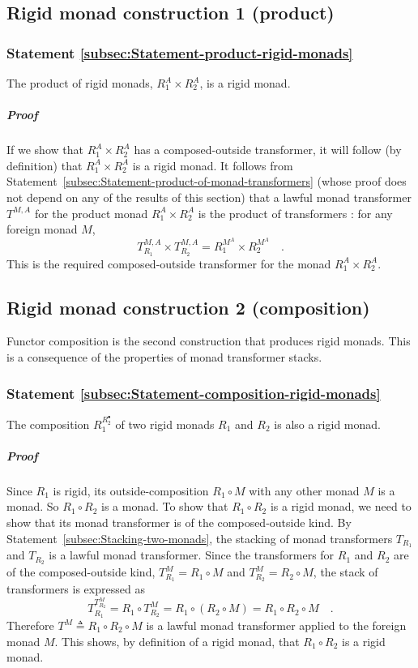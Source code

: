 \subsection{Rigid monad construction 1 (product)}

\subsubsection{Statement \label{subsec:Statement-product-rigid-monads}\ref{subsec:Statement-product-rigid-monads}}

The product of rigid monads, $R_{1}^{A}\times R_{2}^{A}$, is a rigid
monad.

\subparagraph{Proof}

If we show that $R_{1}^{A}\times R_{2}^{A}$ has a composed-outside
transformer, it will follow (by definition) that $R_{1}^{A}\times R_{2}^{A}$
is a rigid monad. It follows from Statement~\ref{subsec:Statement-product-of-monad-transformers}
(whose proof does not depend on any of the results of this section)
that a lawful monad transformer $T^{M,A}$ for the product monad $R_{1}^{A}\times R_{2}^{A}$
is the product of transformers : for any foreign monad $M$,
\[
T_{R_{1}}^{M,A}\times T_{R_{2}}^{M,A}=R_{1}^{M^{A}}\times R_{2}^{M^{A}}\quad.
\]
This is the required composed-outside transformer for the monad $R_{1}^{A}\times R_{2}^{A}$.

\subsection{Rigid monad construction 2 (composition)}

Functor composition is the second construction that produces rigid
monads. This is a consequence of the properties of monad transformer
stacks.

\subsubsection{Statement \label{subsec:Statement-composition-rigid-monads}\ref{subsec:Statement-composition-rigid-monads}}

The composition $R_{1}^{R_{2}^{\bullet}}$ of two rigid monads $R_{1}$
and $R_{2}$ is also a rigid monad.

\subparagraph{Proof}

Since $R_{1}$ is rigid, its outside-composition $R_{1}\circ M$ with
any other monad $M$ is a monad. So $R_{1}\circ R_{2}$ is a monad.
To show that $R_{1}\circ R_{2}$ is a rigid monad, we need to show
that its monad transformer is of the composed-outside kind. By Statement~\ref{subsec:Stacking-two-monads},
the stacking of monad transformers $T_{R_{1}}$and $T_{R_{2}}$ is
a lawful monad transformer. Since the transformers for $R_{1}$ and
$R_{2}$ are of the composed-outside kind, $T_{R_{1}}^{M}=R_{1}\circ M$
and $T_{R_{2}}^{M}=R_{2}\circ M$, the stack of transformers is expressed
as
\[
T_{R_{1}}^{T_{R_{2}}^{M}}=R_{1}\circ T_{R_{2}}^{M}=R_{1}\circ(R_{2}\circ M)=R_{1}\circ R_{2}\circ M\quad.
\]
Therefore $T^{M}\triangleq R_{1}\circ R_{2}\circ M$ is a lawful monad
transformer applied to the foreign monad $M$. This shows, by definition
of a rigid monad, that $R_{1}\circ R_{2}$ is a rigid monad.

